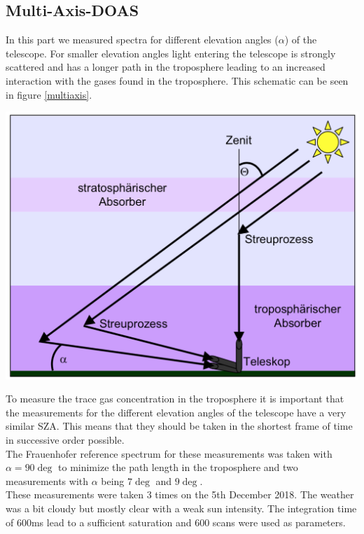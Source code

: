 \documentclass[12pt, english]{scrartcl} %
\newenvironment{Figure}
  {\par\medskip\noindent\minipage{\linewidth}}
  {\endminipage\par\medskip}
\begin{document}
\begin{multicols}{2}
\subsection{Multi-Axis-DOAS}
In this part we measured spectra for different elevation angles ($\alpha$) of the telescope. For smaller elevation angles light entering the telescope is strongly scattered and has a longer path in the troposphere leading to an increased interaction with the gases found in the troposphere. This schematic can be seen in figure \ref{multiaxis}.
\begin{Figure}
 \centering
 \captionsetup{format=plain}
 \includegraphics[width=\linewidth]{graphics/multiaxis.png}
 \label{multiaxis}
\end{Figure}
To measure the trace gas concentration in the troposphere it is important that the measurements for the different elevation angles of the telescope have a very similar SZA. This means that they should be taken in the shortest frame of time in successive order possible.\\
The Frauenhofer reference spectrum for these measurements was taken with $\alpha = 90\deg$ to minimize the path length in the troposphere and two measurements with $\alpha$ being $7 \deg$ and $9 \deg$.\\
These measurements were taken 3 times on the 5th December 2018. The weather was a bit cloudy but mostly clear with a weak sun intensity.
The integration time of $600$ms lead to a sufficient saturation and 600 scans were used as parameters.

\end{multicols}
\end{document}
